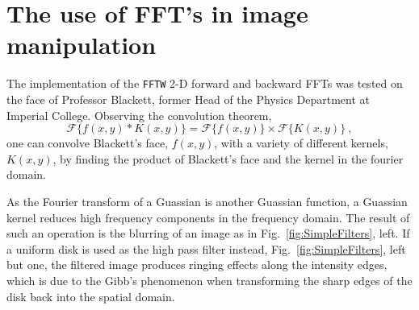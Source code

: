 \documentclass[10pt,a4paper]{article}
\begin{document}
\newpage
\section{The use of FFT's in image manipulation}
The implementation of the \texttt{FFTW} 2-D forward and backward FFTs was tested on the face of Professor Blackett, former Head of the Physics Department at Imperial College. Observing the convolution theorem,
\begin{equation}
\mathcal{F}\{ f(x,y)*K(x,y)\}=\mathcal{F}\{ f(x,y)\}\times\mathcal{F}\{ K(x,y)\}\: ,
\end{equation}
one can convolve Blackett's face, $f(x,y)$, with a variety of different kernels, $K(x,y)$, by finding the product of Blackett's face and the kernel in the fourier domain. 

As the Fourier transform of a Guassian is another Guassian function, a Guassian kernel reduces high frequency components in the frequency domain. The result of such an operation is the blurring of an image as in  Fig.~\ref{fig:SimpleFilters}, left. If a uniform disk is used as the high pass filter instead, Fig.~\ref{fig:SimpleFilters}, left but one, the filtered image produces ringing effects along the intensity edges, which is due to the Gibb's phenomenon when transforming the sharp edges of the disk back into the spatial domain.
\end{document}
